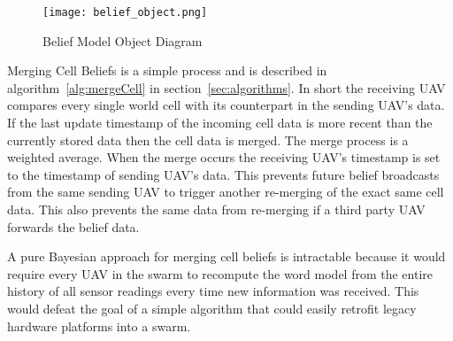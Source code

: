 \begin{figure}[H]
	\centering
	\texttt{[image: belief\_object.png]}
	\caption{Belief Model Object Diagram}
	\label{fig:belief_object}
\end{figure}
\begin{multicols*}{2}
	

Merging Cell Beliefs is a simple process and is described in algorithm~\ref{alg:mergeCell} in section~\ref{sec:algorithms}.   In short the receiving UAV compares every single world cell with its counterpart in the sending UAV's data.  If the last update timestamp of the incoming cell data is more recent than the currently stored data then the cell data is merged.  The merge process is a weighted average.  When the merge occurs the receiving UAV's timestamp is set to the timestamp of sending UAV's data.  This prevents future belief broadcasts from the same sending UAV to trigger another re-merging of the exact same cell data.  This also prevents the same data from re-merging if a third party UAV forwards the belief data. 


A pure Bayesian approach for merging cell beliefs is intractable because it would require every UAV in the swarm to recompute the word model from the entire history of all sensor readings every time new information was received.  This would defeat the goal of a simple algorithm that could easily retrofit legacy hardware platforms into a swarm.


\end{multicols*}
